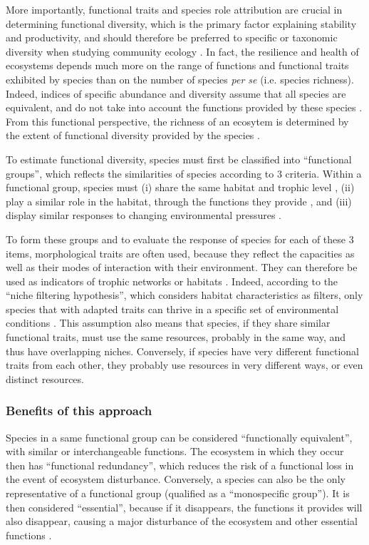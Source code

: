 More importantly, functional traits and species role attribution are crucial in determining functional diversity, which is the primary factor explaining stability and productivity, and should therefore be preferred to specific or taxonomic diversity when studying community ecology \citep{dumay2004,mejri2009}. In fact, the resilience and health of ecosystems depends much more on the range of functions and functional traits exhibited by species than on the number of species \textit{per se} (i.e. species richness). Indeed, indices of specific abundance and diversity assume that all species are equivalent, and do not take into account the functions provided by these species \citep{mejri2009}. From this functional perspective, the richness of an ecosytem is determined by the extent of functional diversity provided by the species \citep{rocklin2004}. 

To estimate functional diversity, species must first be classified into ``functional groups'', which reflects the similarities of species according to 3 criteria. Within a functional group, species must (i) share the same habitat and trophic level \citep{brindamour2016}, (ii) play a similar role in the habitat, through the functions they provide \citep{dumay2004,mejri2009}, and (iii) display similar responses to changing environmental pressures \citep{brindamour2016,dumay2004,mejri2009}.

To form these groups and to evaluate the response of species for each of these 3 items, morphological traits are often used, because they reflect the capacities as well as their modes of interaction with their environment. They can therefore be used as indicators of trophic networks or habitats \citep{brindamour2016}. Indeed, according to the “niche filtering hypothesis”, which considers habitat characteristics as filters, only species that with adapted traits can thrive in a specific set of environmental conditions \citep{brindamour2011}. This assumption also means that species, if they share similar functional traits, must use the same resources, probably in the same way, and thus have overlapping niches. Conversely, if species have very different functional traits from each other, they probably use resources in very different ways, or even distinct resources. 

\subsubsection{Benefits of this approach}

Species in a same functional group can be considered ``functionally equivalent'', with similar or interchangeable functions. The ecosystem in which they occur then has ``functional redundancy'', which reduces the risk of a functional loss in the event of ecosystem disturbance. Conversely, a species can also be the only representative of a functional group (qualified as a ``monospecific group''). It is then considered ``essential'', because if it disappears, the functions it provides will also disappear, causing a major disturbance of the ecosystem and other essential functions \citep{mejri2009}. 

